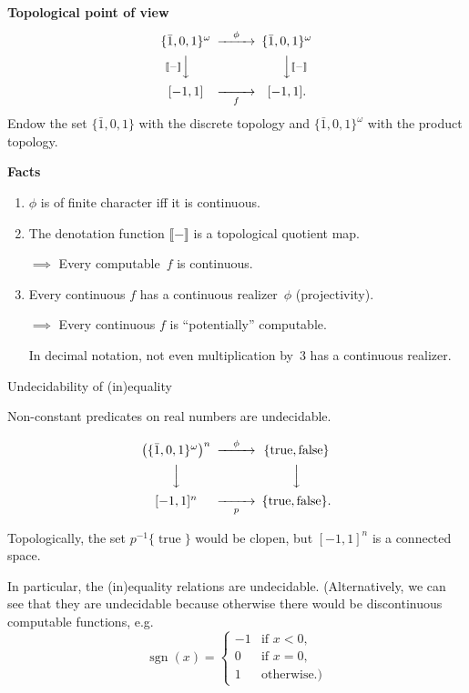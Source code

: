 \documentclass{csslides-1.1}
\newcommand{\True}{\operatorname{true}}
\newcommand{\False}{\operatorname{false}}
\begin{document}
\begin{slide}{}
{\bf Topological point of view}
\[
\begin{CD}
\{\bar{1},0,1\}^{\omega}  @>{\phi}>>  \{\bar{1},0,1\}^{\omega} \\
@V{\llbracket - \rrbracket}VV @VV{\llbracket - \rrbracket}V \\
[-1,1] @>>{f}> [-1,1].
\end{CD} 
\]
Endow the set $\{\bar{1},0,1\}$ with the discrete topology and
$\{\bar{1},0,1\}^{\omega}$ with the product topology.

{\bf Facts}
\begin{enumerate}
\item $\phi$ is of finite character iff it is continuous.

\item The denotation function $\llbracket - \rrbracket$ is a
topological quotient map.


$\implies$ Every computable~$f$ is continuous.

\item Every continuous $f$ has a continuous
realizer~$\phi$ (projectivity).

$\implies$ Every continuous $f$ is ``potentially'' computable.

In decimal notation, not even multiplication by~$3$ has a continuous
realizer.
\end{enumerate}

\vfill

\end{slide}

\begin{slide}{Undecidability of (in)equality}

Non-constant predicates on real numbers are undecidable.

\[
\begin{CD}
\left(\{\bar{1},0,1\}^{\omega}\right)^n @>{\phi}>>  \{\True,\False\} \\
@V{}VV @VV{}V \\
[-1,1]^n @>>{p}> \{\True,\False\}.
\end{CD} 
\]

Topologically, the set $p^{-1}\{\True\}$ would be clopen, but
$[-1,1]^n$ is a connected space.

In particular, the (in)equality relations are undecidable.
(Alternatively, we can see that they are undecidable because otherwise
there would be discontinuous computable functions, e.g.
\[
\operatorname{sgn}(x) = \begin{cases}
                    -1 & \text{if $x < 0$,} \\
                    0 & \text{if $x=0$,} \\
                    1 & \text{otherwise.)} 
                    \end{cases}
\]
\end{slide}
\end{document}
